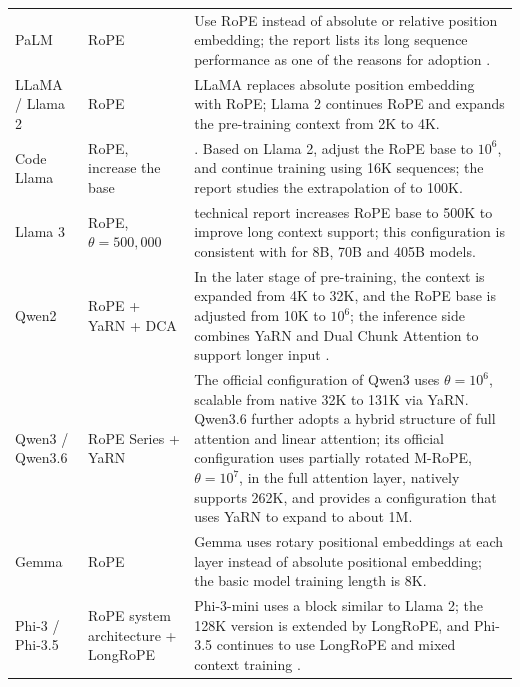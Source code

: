 \documentclass[UTF8,fontset=none,a4paper,10pt]{ctexart}
\begin{document}
\begin{longtable}{@{}p{2.7cm}p{3.6cm}p{8.0cm}@{}}
PaLM & RoPE & Use RoPE instead of absolute or relative position embedding; the report lists its long sequence performance as one of the reasons for adoption \cite{en:chowdhery2022palm}. \\

LLaMA / Llama 2 & RoPE & LLaMA replaces absolute position embedding with RoPE; Llama 2 continues RoPE and expands the pre-training context from 2K to 4K\cite{en:touvron2023llama,en:touvron2023llama2}. \\

Code Llama & RoPE, increase the base &. Based on Llama 2, adjust the RoPE base to $10^6$, and continue training using 16K sequences; the report studies the extrapolation of \cite{en:roziere2023codellama} to 100K. \\

Llama 3 & RoPE, $\theta=500{,}000$ & technical report increases RoPE base to 500K to improve long context support; this configuration is consistent with \cite{en:dubey2024llama3} for 8B, 70B and 405B models. \\

Qwen2 & RoPE + YaRN + DCA & In the later stage of pre-training, the context is expanded from 4K to 32K, and the RoPE base is adjusted from 10K to $10^6$; the inference side combines YaRN and Dual Chunk Attention to support longer input \cite{en:yang2024qwen2}. \\

Qwen3 / Qwen3.6 & RoPE Series + YaRN & The official configuration of Qwen3 uses $\theta=10^6$, scalable from native 32K to 131K\cite{en:yang2025qwen3} via YaRN. Qwen3.6 further adopts a hybrid structure of full attention and linear attention; its official configuration uses partially rotated M-RoPE, $\theta=10^7$, in the full attention layer, natively supports 262K, and provides a configuration \cite{en:qwen36config} that uses YaRN to expand to about 1M. \\

Gemma & RoPE & Gemma uses rotary positional embeddings at each layer instead of absolute positional embedding; the basic model training length is 8K\cite{en:gemmateam2024}. \\

Phi-3 / Phi-3.5 & RoPE system architecture + LongRoPE & Phi-3-mini uses a block similar to Llama 2; the 128K version is extended by LongRoPE, and Phi-3.5 continues to use LongRoPE and mixed context training \cite{en:abdin2024phi3}. \\


\end{longtable}
\end{document}
